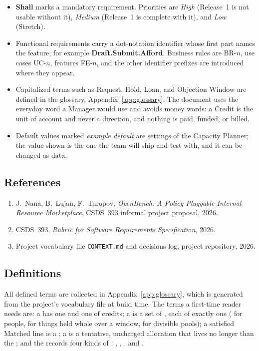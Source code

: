 \begin{itemize}
  \item \textbf{Shall} marks a mandatory requirement. Priorities are \emph{High} (Release~1 is not usable without it), \emph{Medium} (Release~1 is complete with it), and \emph{Low} (Stretch).
  \item Functional requirements carry a dot-notation identifier whose first part names the feature, for example \textbf{Draft.Submit.Afford}. Business rules are BR-$n$, use cases UC-$n$, features FE-$n$, and the other identifier prefixes are introduced where they appear.
  \item Capitalized terms such as Request, Hold, Loan, and Objection Window are defined in the glossary, Appendix~\ref{app:glossary}. The document uses the everyday word a Manager would use and avoids money words: a Credit is the unit of account and never a direction, and nothing is paid, funded, or billed.
  \item Default values marked \emph{example default} are settings of the Capacity Planner; the value shown is the one the team will ship and test with, and it can be changed as data.
\end{itemize}

\subsection{References}

\begin{enumerate}
  \item J.~Nana, B.~Lujan, F.~Turopov, \emph{OpenBench: A Policy-Pluggable Internal Resource Marketplace}, CSDS~393 informal project proposal, 2026.
  \item CSDS~393, \emph{Rubric for Software Requirements Specification}, 2026.
  \item Project vocabulary file \texttt{CONTEXT.md} and decisions log, project repository, 2026.
\end{enumerate}

\subsection{Definitions}

All defined terms are collected in Appendix~\ref{app:glossary}, which is generated from the project's vocabulary file at build time. The terms a first-time reader needs are: a  has one  and one  of credits; a  is a set of , each of exactly one  ( for people,  for things held whole over a window,  for divisible pools); a satisfied Matched line is a ; a  is a tentative, uncharged allocation that lives no longer than the ; and the  records four kinds of : , , , and .
